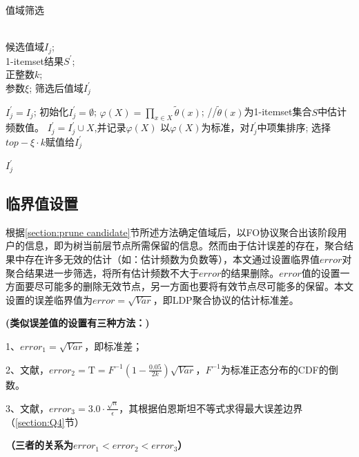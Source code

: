 \documentclass[UTF8,a4paper]{ctexart}
\begin{document}
\begin{algorithm}[h]
\caption{值域筛选}
\label{alg:prune}
\begin{algorithmic}[1]
\REQUIRE ~~\\
候选值域$I_{j}$;\\
1-itemset结果$S^{\prime}$;\\
正整数$k$;\\
参数$\xi$;
\ENSURE 筛选后值域$I^{\prime}_{j}$

    \STATE $I^{\prime}_{j} = I_{j}$;
\ELSE
    \STATE 初始化$I^{\prime}_{j} = \emptyset$;
        \STATE $\varphi(X)=\prod_{x \in X} \tilde{\theta}(x)$;    //$\tilde{\theta}(x)$为1-itemset集合$S$中估计频数值。
        \STATE $I^{\prime}_{j} = I^{\prime}_{j} \cup X$,并记录$\varphi(X)$
    \ENDFOR
    \STATE 以$\varphi(X)$为标准，对$I^{\prime}_{j}$中项集排序;
    \STATE 选择$top-\xi \cdot k$赋值给$I^{\prime}_{j}$
\ENDIF

\RETURN $I^{\prime}_{j}$
\end{algorithmic}
\end{algorithm}

\subsection{临界值设置}
\label{section:tree threshold}
根据\ref{section:prune candidate}节所述方法确定值域后，以FO协议聚合出该阶段用户的信息，即为树当前层节点所需保留的信息。然而由于估计误差的存在，聚合结果中存在许多无效的估计（如：估计频数为负数等），本文通过设置临界值$error$对聚合结果进一步筛选，将所有估计频数不大于$error$的结果删除。$error$值的设置一方面要尽可能多的删除无效节点，另一方面也要将有效节点尽可能多的保留。本文设置的误差临界值为$error = \sqrt{Var}$，即LDP聚合协议的估计标准差。

\textbf{(类似误差值的设置有三种方法：)}

1、$error_{1} = \sqrt{Var}$，即标准差；

2、文献\cite{wang2017locally,warner1965randomized,wang2018locally}，$error_{2} = \mathrm{T}=F^{-1}\left(1-\frac{0.05}{2 k}\right) \sqrt{V a r}$，$F^{-1}$为标准正态分布的CDF的倒数。

3、文献\cite{wang2018privtrie}，$error_{3} = 3.0 \cdot \frac{\sqrt{n}}{\epsilon}$，其根据伯恩斯坦不等式求得最大误差边界（\ref{section:Q4}节）

\textbf{（三者的关系为$error_{1} < error_{2} < error_{3}$）}
\end{document}
